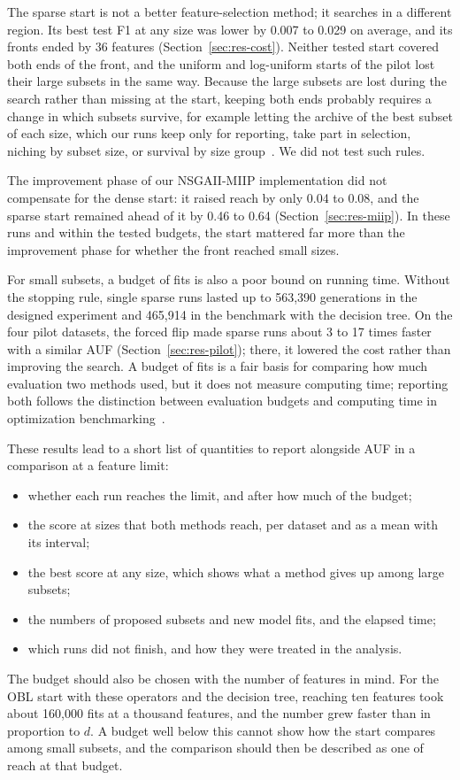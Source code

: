 The sparse start is not a better feature-selection method; it searches in a different region. Its best test F1 at any size was lower by 0.007 to 0.029 on average, and its fronts ended by 36 features (Section~\ref{sec:res-cost}). Neither tested start covered both ends of the front, and the uniform and log-uniform starts of the pilot lost their large subsets in the same way. Because the large subsets are lost during the search rather than missing at the start, keeping both ends probably requires a change in which subsets survive, for example letting the archive of the best subset of each size, which our runs keep only for reporting, take part in selection, niching by subset size, or survival by size group~\cite{Li2026CORAL}. We did not test such rules.

The improvement phase of our NSGAII-MIIP implementation did not compensate for the dense start: it raised reach by only 0.04 to 0.08, and the sparse start remained ahead of it by 0.46 to 0.64 (Section~\ref{sec:res-miip}). In these runs and within the tested budgets, the start mattered far more than the improvement phase for whether the front reached small sizes.

For small subsets, a budget of fits is also a poor bound on running time. Without the stopping rule, single sparse runs lasted up to 563{,}390 generations in the designed experiment and 465{,}914 in the benchmark with the decision tree. On the four pilot datasets, the forced flip made sparse runs about 3 to 17 times faster with a similar AUF (Section~\ref{sec:res-pilot}); there, it lowered the cost rather than improving the search. A budget of fits is a fair basis for comparing how much evaluation two methods used, but it does not measure computing time; reporting both follows the distinction between evaluation budgets and computing time in optimization benchmarking~\cite{BartzBeielstein2020}.

These results lead to a short list of quantities to report alongside AUF in a comparison at a feature limit:
\begin{itemize}
  \item whether each run reaches the limit, and after how much of the budget;
  \item the score at sizes that both methods reach, per dataset and as a mean with its interval;
  \item the best score at any size, which shows what a method gives up among large subsets;
  \item the numbers of proposed subsets and new model fits, and the elapsed time;
  \item which runs did not finish, and how they were treated in the analysis.
\end{itemize}
The budget should also be chosen with the number of features in mind. For the OBL start with these operators and the decision tree, reaching ten features took about 160{,}000 fits at a thousand features, and the number grew faster than in proportion to $d$. A budget well below this cannot show how the start compares among small subsets, and the comparison should then be described as one of reach at that budget.

